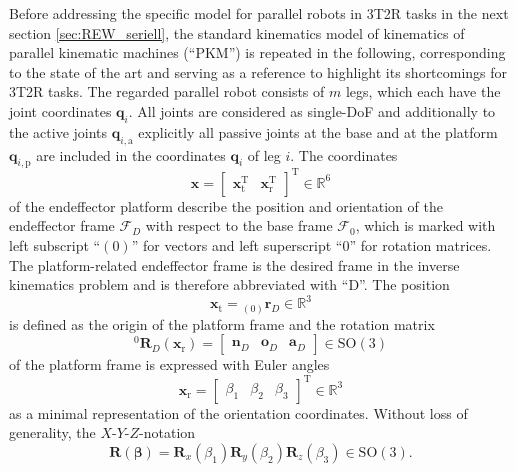 \documentclass[robotics,article,submit,moreauthors,pdftex]{Definitions/mdpi}
\newcommand{\bm}[1]{\boldsymbol{#1}}
\newcommand{\ortvek}[4]{{ }_{(#1)}{\boldsymbol{#2}}^{#3}_{#4} }
\newcommand{\vek}[3]{\boldsymbol{#1}^{#2}_{#3}}
\newcommand{\rotmat}[2]{{{ }^{#1}\boldsymbol{R}}_{#2}}
\newcommand{\transp}[0]{{\mathrm{T}}}
\newcommand{\ks}[1]{{\mathcal{F}}_{#1}}
\begin{document}
Before addressing the specific model for parallel robots in 3T2R tasks in the next section \ref{sec:REW_seriell}, the standard kinematics model of kinematics of parallel kinematic machines (``PKM'') is repeated in the following, corresponding to the state of the art \cite{Merlet2006,Gogu2008,BriotKha2015} and serving as a reference to highlight its shortcomings for 3T2R tasks.
The regarded parallel robot consists of $m$ legs, which each have the joint coordinates $\bm{q}_i$.
All joints are considered as single-DoF and additionally to the active joints $\bm{q}_{i,\mathrm{a}}$ explicitly all passive joints at the base and at the platform $\bm{q}_{i,\mathrm{p}}$ are included in the coordinates $\bm{q}_i$ of leg $i$.
The coordinates
%
\begin{equation}
\bm{x}
=
\begin{bmatrix}
\bm{x}_{\mathrm{t}}^\transp & \bm{x}_{\mathrm{r}}^\transp
\end{bmatrix}^\transp
\in {\mathbb{R}}^{6}
\label{equ:x_def}
\end{equation}
%
of the endeffector platform describe the position and orientation of the endeffector frame  $\ks{D}$ with respect to the base frame $\ks{0}$, which is marked with left subscript ``$(0)$'' for vectors and left superscript ``$0$'' for rotation matrices.
The platform-related endeffector frame is the desired frame in the inverse kinematics problem and is therefore abbreviated with ``D''.
The position 
%
\begin{equation}
\bm{x}_{\mathrm{t}}
=
\ortvek{0}{r}{}{D}
\in {\mathbb{R}}^{3}
\label{equ:xt_def}
\end{equation}  
%
is defined as the origin of the platform frame and the rotation matrix
%
\begin{equation}
\rotmat{0}{D} (\bm{x}_{\mathrm{r}})
=
\begin{bmatrix}\vek{n}{}{D} & \vek{o}{}{D} & \vek{a}{}{D}\end{bmatrix} \in \mathrm{SO(3)}
\label{equ:xr_def_rotmat}
\end{equation}
%
of the platform frame is expressed with Euler angles
%
\begin{equation}
\bm{x}_{\mathrm{r}}
=
\begin{bmatrix}
\beta_1  & \beta_2 & \beta_3
\end{bmatrix}^{\mathrm{T}}
\in {\mathbb{R}}^{3}
\label{equ:xr_def}
\end{equation} 
%
as a minimal representation of the orientation coordinates.
Without loss of generality, the $X$-$Y$-$Z$-notation
%
\begin{equation}
\bm{R}(\bm{\beta}) = \bm{R}_x(\beta_1) \bm{R}_y(\beta_2) \bm{R}_z(\beta_3) \in \mathrm{SO(3)}.
\label{equ:def_rmat_xyz}
\end{equation}
\end{document}
